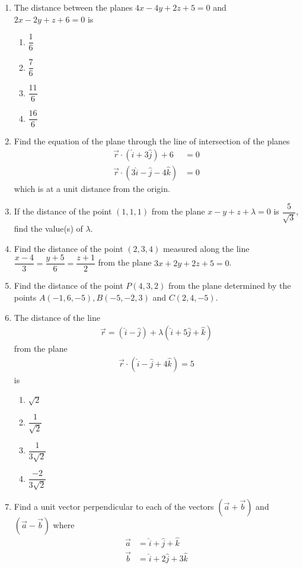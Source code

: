 \begin{enumerate}
	\item The distance between the planes $4x-4y+2z+5=0$ and $2x-2y+z+6=0$ is

		\begin{enumerate}

			\item $\dfrac{1}{6}$
			\item $\dfrac{7}{6}$
			\item $\dfrac{11}{6}$
			\item $\dfrac{16}{6}$
		\end{enumerate}

	\item Find the equation of the plane through the line of intersection of the planes
		\begin{align}
			\vec{r}\cdot(\hat{i}+3\hat{j})+6&=0\\\vec{r}\cdot(3\hat{i}-\hat{j}-4\hat{k})&=0
		\end{align}which is at a  unit distance from the origin.

		\item If the distance of the point $(1,1,1)$ from the plane $x-y+z+\lambda=0$ is $\dfrac{5}{\sqrt{3}}$, find the value(s) of $\lambda$.

	\item Find the distance of the point $(2,3,4)$ measured along the line $\dfrac{x-4}{3}=\dfrac{y+5}{6}=\dfrac{z+1}{2}$ from the plane $3x+2y+2z+5=0$.

	\item Find the distance of the point $P(4,3,2)$ from the plane determined by the points $A(-1,6,-5),B(-5,-2,3)$ and $C(2,4,-5)$.

	\item The distance of the line
		\begin{align}
		\vec{r}=(\hat{i}-\hat{j})+\lambda(\hat{i}+5\hat{j}+\hat{k})\end{align}
		from the plane
		\begin{align}
		\vec{r}\cdot(\hat{i}-\hat{j}+4\hat{k})=5\end{align}
		is
		\begin{enumerate}
			\item $\sqrt{2}$
			\item $\dfrac{1}{\sqrt{2}}$
			\item $\dfrac{1}{3\sqrt{2}}$
			\item $\dfrac{-2}{3\sqrt{2}}$
		\end{enumerate}

	\item Find a unit vector perpendicular to each of the vectors $(\vec{a}+\vec{b})$ and $(\vec{a}-\vec{b})$ where 
	\begin{align}
		\vec{a}&=\hat{i}+\hat{j}+\hat{k}\\\vec{b}&=\hat{i}+2\hat{j}+3\hat{k}
	\end{align}


\end{enumerate}
